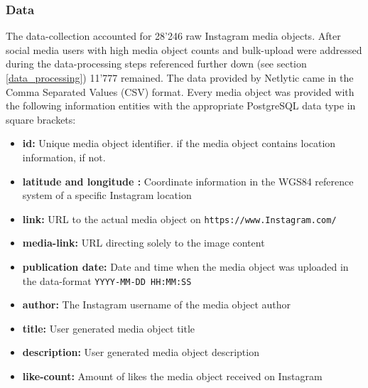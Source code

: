 \subsubsection{Data} \label{Instagram_data}
The data-collection accounted for 28'246 raw Instagram media objects. After social media users with high media object counts and bulk-upload were addressed during the data-processing steps referenced further down (see section \ref{data_processing}) 11'777 remained.
The data provided by Netlytic came in the Comma Separated Values (CSV) format. Every media object was provided with the following information entities with the appropriate PostgreSQL data type in square brackets:
\begin{itemize}[label={}]
    \item \textbf{id:} Unique media object identifier.  if the media object contains location information,  if not.
    \item \textbf{latitude and longitude
    :} Coordinate information in the WGS84 reference system of a specific Instagram location 
    \item \textbf{link:} URL to the actual media object on \texttt{https://www.Instagram.com/} 
    \item \textbf{media-link:} URL directing solely to the image content 
    \item \textbf{publication date:} Date and time when the media object was uploaded in the data-format \texttt{YYYY-MM-DD HH:MM:SS} 
    \item \textbf{author:} The Instagram username of the media object author 
    \item \textbf{title:} User generated media object title 
    \item \textbf{description:} User generated media object description 
    \item \textbf{like-count:} Amount of likes the media object received on Instagram 
\end{itemize}

